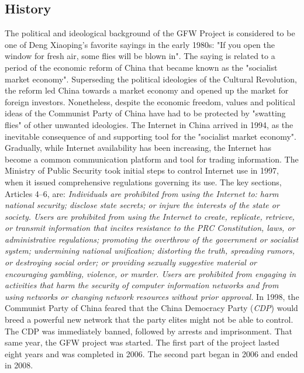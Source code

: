 \documentclass[10pt,conference,a4paper]{IEEEtran}%
\begin{document}
\subsection{History}
The political and ideological background of the GFW Project is considered to be one of Deng Xiaoping’s favorite sayings in the early 1980s: "If you open the window for fresh air, some flies will be blown in". The saying is related to a period of the economic reform of China that became known as the "socialist market economy". Superseding the political ideologies of the Cultural Revolution, the reform led China towards a market economy and opened up the market for foreign investors. Nonetheless, despite the economic freedom, values and political ideas of the Communist Party of China have had to be protected by "swatting flies" of other unwanted ideologies.
The Internet in China arrived in 1994, as the inevitable consequence of and supporting tool for the "socialist market economy". Gradually, while Internet availability has been increasing, the Internet has become a common communication platform and tool for trading information.
The Ministry of Public Security took initial steps to control Internet use in 1997, when it issued comprehensive regulations governing its use. The key sections, Articles 4–6, are:
\emph{Individuals are prohibited from using the Internet to: harm national security; disclose state secrets; or injure the interests of the state or society. Users are prohibited from using the Internet to create, replicate, retrieve, or transmit information that incites resistance to the PRC Constitution, laws, or administrative regulations; promoting the overthrow of the government or socialist system; undermining national unification; distorting the truth, spreading rumors, or destroying social order; or providing sexually suggestive material or encouraging gambling, violence, or murder. Users are prohibited from engaging in activities that harm the security of computer information networks and from using networks or changing network resources without prior approval.}
In 1998, the Communist Party of China feared that the China Democracy Party (\emph{CDP}) would breed a powerful new network that the party elites might not be able to control. The CDP was immediately banned, followed by arrests and imprisonment. That same year, the GFW project was started. The first part of the project lasted eight years and was completed in 2006. The second part began in 2006 and ended in 2008.
\end{document}
